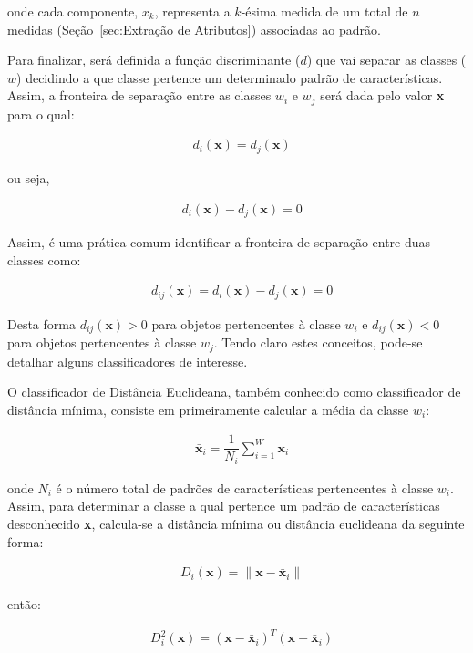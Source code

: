onde cada componente, $x_k$, representa a $k$-ésima medida de um total
de $n$ medidas (Seção~\ref{sec:Extração de Atributos}) associadas ao padrão.

Para finalizar, será definida a função discriminante ($d$) que vai
separar as classes ($w$) decidindo a que classe pertence um
determinado padrão de características. Assim, a fronteira de separação
entre as classes $w_i$ e $w_j$ será dada pelo valor \textbf{x} para o
qual:

\begin{align}
 &d_{i}(\textbf{x})=d_{j}(\textbf{x})
\end{align}

ou seja,

\begin{align}
 &d_{i}(\textbf{x})-d_{j}(\textbf{x})=0
\end{align}

Assim, é uma prática comum identificar a fronteira de separação entre
duas classes como:

\begin{align}\label{eq-dij}
 &d_{ij}(\textbf{x})=d_{i}(\textbf{x})-d_{j}(\textbf{x})=0
\end{align}

Desta forma $d_{ij}(\textbf{x})>0$ para objetos pertencentes à classe
$w_i$ e $d_{ij}(\textbf{x})<0$ para objetos pertencentes à classe
$w_j$. Tendo claro estes conceitos, pode-se detalhar alguns
classificadores de interesse.

O classificador de Distância Euclideana, também conhecido como
classificador de distância mínima, consiste em primeiramente calcular
a média da classe $w_i$:

\begin{align}\label{eq-meadclass}
 &\bar{\textbf{x}}_i=\dfrac{1}{N_i}\sum\limits_{i=1}^W{\textbf{x}_i}
\end{align}

onde $N_i$ é o número total de padrões de características pertencentes
à classe $w_i$. Assim, para determinar a classe a qual pertence um
padrão de características desconhecido \textbf{x}, calcula-se a
distância mínima ou distância euclideana da seguinte forma:

\begin{align}
 &D_i(\textbf{x})=\parallel \textbf{x}-\bar{\textbf{x}}_i \parallel
\end{align}

então:

\begin{align}\label{eq-euclidist}
 &D_i^2(\textbf{x})=\left(\textbf{x} - \bar{\textbf{x}}_i\right)^{T} \left(\textbf{x} - \bar{\textbf{x}}_i\right)
\end{align}

